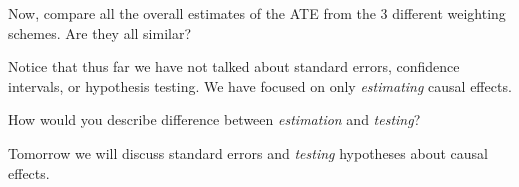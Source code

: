 \documentclass[11pt,leqno]{article}\usepackage[]{graphicx}\usepackage[]{color}
\theoremstyle{newstyle}
\begin{document}
Now, compare all the overall estimates of the ATE from the $3$ different weighting schemes. Are they all similar?

Notice that thus far we have not talked about standard errors, confidence intervals, or hypothesis testing. We have focused on only \textit{estimating} causal effects. 

How would you describe difference between \textit{estimation} and \textit{testing}?

Tomorrow we will discuss standard errors and \textit{testing} hypotheses about causal effects.

\newpage


\begin{singlespace}
\end{singlespace}

\newpage
\end{document}
